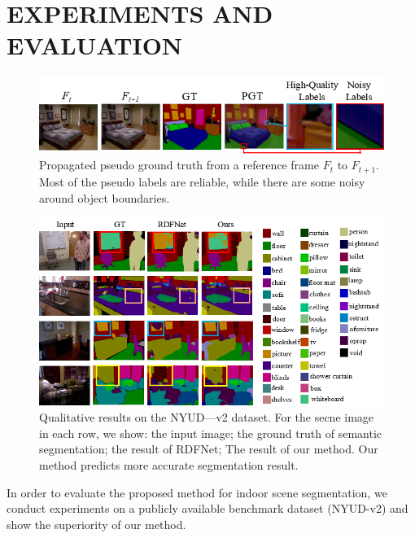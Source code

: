 \section{EXPERIMENTS AND EVALUATION}
\label{sec:exper}

\begin{figure}[t]
	\centering
	\includegraphics[scale=0.48]{figure/PGT.png}
	\caption{Propagated pseudo ground truth from a reference frame $F_t$ to $F_{t+1}$. Most of the pseudo labels are reliable, while there are some noisy around object boundaries.}
	\label{fig:PGT}
\end{figure}

\begin{figure}[!th]
	\centering
	\includegraphics[scale=0.42]{figure/Result.png}
	\caption{Qualitative results on the NYUD—v2 dataset. For the secne image in each row, we show: the input image; the ground truth of semantic segmentation; the result of RDFNet; The result of our method. Our method predicts more accurate segmentation result.}
	\label{fig:VisResult}
\end{figure}

In order to evaluate the proposed method for indoor scene segmentation, we conduct experiments on a publicly available benchmark dataset (NYUD-v2) and show the superiority of our method.



